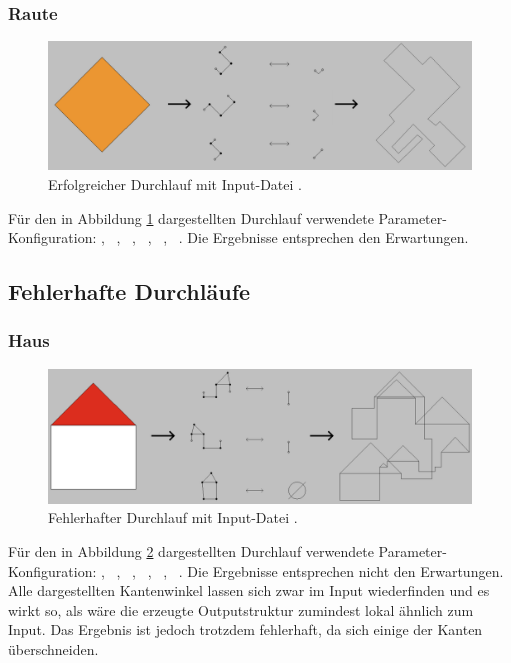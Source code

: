 \subsubsection{Raute}
\begin{figure}[H]
    \centering
    \includegraphics[width=\textwidth]{images/rhombus_success.png}
    \caption{Erfolgreicher Durchlauf mit Input-Datei .}
    \label{fig:rhombus_success}
\end{figure}
Für den in Abbildung \ref{fig:rhombus_success} dargestellten Durchlauf verwendete Parameter-Konfiguration: , \ , \ ,
\ , \ , \ . Die Ergebnisse entsprechen den Erwartungen.

\subsection{Fehlerhafte Durchläufe}

\subsubsection{Haus}
\begin{figure}[H]
    \centering
    \includegraphics[width=\textwidth]{images/house_fail.png}
    \caption{Fehlerhafter Durchlauf mit Input-Datei .}
    \label{fig:house_fail}
\end{figure}
Für den in Abbildung \ref{fig:house_fail} dargestellten Durchlauf verwendete Parameter-Konfiguration: , \ , \ ,
\ , \ , \ . Die Ergebnisse entsprechen nicht den Erwartungen. Alle dargestellten Kantenwinkel
lassen sich zwar im Input wiederfinden und es wirkt so, als wäre die erzeugte Outputstruktur zumindest lokal ähnlich zum Input. Das Ergebnis ist jedoch
trotzdem fehlerhaft, da sich einige der Kanten überschneiden.

